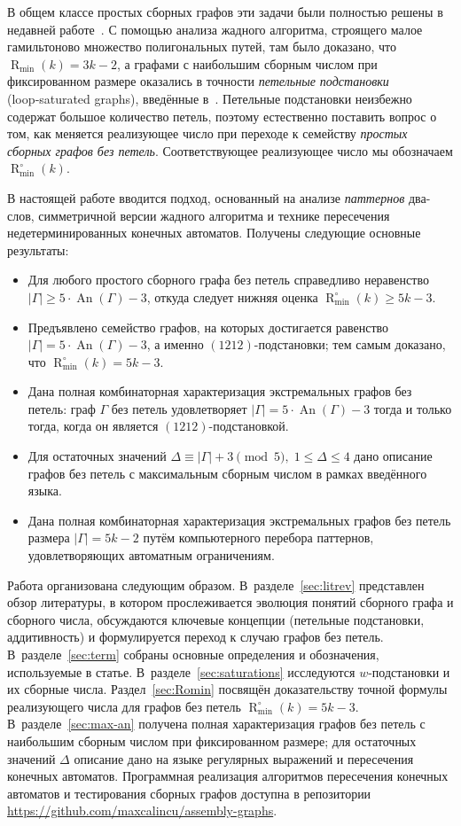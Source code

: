 \documentclass{article}
\theoremstyle{definition}
\newcommand{\An}{\operatorname{An}}
\newcommand{\D}{\Delta}
\newcommand{\Rmin}{\operatorname{R}_{\min}}
\newcommand{\Romin}{\operatorname{R}_{\min}^\circ}
\begin{document}
В общем классе простых сборных графов эти задачи были полностью решены в недавней работе~\cite{MaksaevPreprint}. С помощью анализа жадного алгоритма, строящего малое гамильтоново множество полигональных путей, там было доказано, что $\Rmin(k)=3k-2$, а графами с наибольшим сборным числом при фиксированном размере оказались в точности \emph{петельные подстановки} (loop‑saturated graphs), введённые в~\cite{Muche2012}. Петельные подстановки неизбежно содержат большое количество петель, поэтому естественно поставить вопрос о том, как меняется реализующее число при переходе к семейству \emph{простых сборных графов без петель}. Соответствующее реализующее число мы обозначаем $\Romin(k)$.

В настоящей работе вводится подход, основанный на анализе \emph{паттернов} два-слов, симметричной версии жадного алгоритма и технике пересечения недетерминированных конечных автоматов. Получены следующие основные результаты:
\begin{itemize}
    \item Для любого простого сборного графа без петель справедливо неравенство $|\Gamma|\ge 5\cdot\An(\Gamma)-3$, откуда следует нижняя оценка $\Romin(k)\ge 5k-3$.
    \item Предъявлено семейство графов, на которых достигается равенство $|\Gamma|=5\cdot\An(\Gamma)-3$, а именно $(1212)$-подстановки; тем самым доказано, что $\Romin(k)=5k-3$.
    \item Дана полная комбинаторная характеризация экстремальных графов без петель: граф $\Gamma$ без петель удовлетворяет $|\Gamma|=5\cdot\An(\Gamma)-3$ тогда и только тогда, когда он является $(1212)$-подстановкой.
    \item Для остаточных значений $\D\equiv|\Gamma|+3\pmod{5},\; 1 \leq\D \leq 4$ дано описание графов без петель с максимальным сборным числом в рамках введённого языка.
    \item Дана полная комбинаторная характеризация экстремальных графов без петель размера $|\Gamma| = 5k - 2$ путём компьютерного перебора паттернов, удовлетворяющих автоматным ограничениям.
\end{itemize}

Работа организована следующим образом. В~разделе~\ref{sec:litrev} представлен обзор литературы, в котором прослеживается эволюция понятий сборного графа и сборного числа, обсуждаются ключевые концепции (петельные подстановки, аддитивность) и формулируется переход к случаю графов без петель. В~разделе~\ref{sec:term} собраны основные определения и обозначения, используемые в статье. В~разделе~\ref{sec:saturations} исследуются $w$-подстановки и их сборные числа. Раздел~\ref{sec:Romin} посвящён доказательству точной формулы реализующего числа для графов без петель $\Romin(k)=5k-3$. В~разделе~\ref{sec:max-an} получена полная характеризация графов без петель с наибольшим сборным числом при фиксированном размере; для остаточных значений $\D$ описание дано на языке регулярных выражений и пересечения конечных автоматов. Программная реализация алгоритмов пересечения конечных автоматов и тестирования сборных графов доступна в репозитории \url{https://github.com/maxcalincu/assembly-graphs}.
\end{document}
